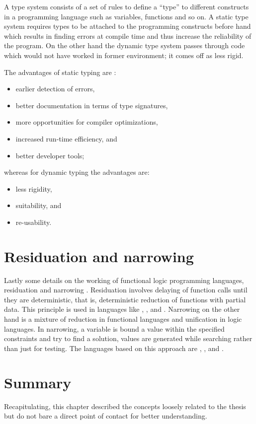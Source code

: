 \documentclass[proposal.tex]{subfiles}
\begin{document}
A type system consists of a set of rules to define a ``type'' to different constructs in a
programming language such as variables, functions and so on.
A static type system requires types to be attached to the programming constructs before hand which results in
finding errors at compile time and thus increase the reliability of the program.
On the other hand the dynamic type system passes through code which would not have worked in former
environment; it comes off as less rigid.


The advantages of static typing \cite{meijer2004static} are :
\begin{itemize}
\item earlier detection of errors,
\item better documentation in terms of type signatures,
\item more opportunities for compiler optimizations,
\item increased run-time efficiency, and
\item better developer tools;
\end{itemize}

whereas for dynamic typing the advantages are:
\begin{itemize}
\item less rigidity,
\item suitability, and
\item re-usability.
\end{itemize}

\section{Residuation and narrowing}
Lastly some details on the working of functional logic programming languages, residuation and narrowing
\cite{hanus1995curry,webiste:wikicurry}.
Residuation involves delaying of function calls until they are deterministic, that is, deterministic reduction of
functions with partial data.
This principle is used in languages like  \cite{lloyd1999programming:escher}, 
\cite{website:life},  \cite{website:nue-prolog} and  \cite{website:oz-mozart}.
Narrowing on the other hand is a mixture of reduction in functional languages and unification in logic languages.
In narrowing, a variable is bound a value within the specified constraints and try to find a solution, values are
generated while searching rather than just for testing.
The languages based on this approach are  \cite{website:alf},  \cite{website:babel},
 \cite{bert1987lpg} and  \cite{website:curry}.


\section{Summary}
Recapitulating, this chapter described the concepts loosely related to the thesis but do not bare a direct point of
contact for better understanding.
\end{document}
